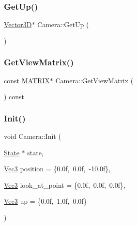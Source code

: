\mbox{\label{class_camera_aa767cb71ea435cee1e42effc912904eb}} 
\subsubsection{\texorpdfstring{Get\+Up()}{GetUp()}}
{\footnotesize\ttfamily \mbox{\hyperlink{class_vector3_d}{Vector3D}}$\ast$ Camera\+::\+Get\+Up (\begin{DoxyParamCaption}{ }\end{DoxyParamCaption})\hspace{0.3cm}{\ttfamily [inline]}}

\mbox{\label{class_camera_aa472374f61480c5a9dff89d30be029f4}} 
\subsubsection{\texorpdfstring{Get\+View\+Matrix()}{GetViewMatrix()}}
{\footnotesize\ttfamily const \mbox{\hyperlink{_vector3_d_8h_a032295cd9fb1b711757c90667278e744}{M\+A\+T\+R\+IX}}$\ast$ Camera\+::\+Get\+View\+Matrix (\begin{DoxyParamCaption}{ }\end{DoxyParamCaption}) const\hspace{0.3cm}{\ttfamily [inline]}}

\mbox{\label{class_camera_a03e3ca8b70417632f7b1b581426ec66d}} 
\subsubsection{\texorpdfstring{Init()}{Init()}}
{\footnotesize\ttfamily void Camera\+::\+Init (\begin{DoxyParamCaption}\item[{\mbox{\hyperlink{class_camera_1_1_state}{State}} $\ast$}]{state,  }\item[{\mbox{\hyperlink{_vector3_d_8h_ab16f59e4393f29a01ec8b9bbbabbe65d}{Vec3}}}]{position = {\ttfamily \{0.0f,~0.0f,~-\/10.0f\}},  }\item[{\mbox{\hyperlink{_vector3_d_8h_ab16f59e4393f29a01ec8b9bbbabbe65d}{Vec3}}}]{look\+\_\+at\+\_\+point = {\ttfamily \{0.0f,~0.0f,~0.0f\}},  }\item[{\mbox{\hyperlink{_vector3_d_8h_ab16f59e4393f29a01ec8b9bbbabbe65d}{Vec3}}}]{up = {\ttfamily \{0.0f,~1.0f,~0.0f\}} }\end{DoxyParamCaption})}



